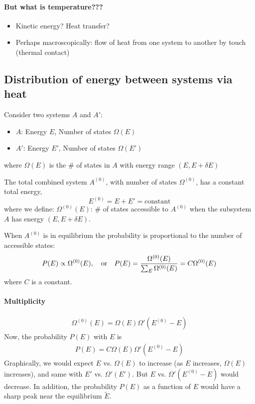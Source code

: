 \documentclass[../main.tex]{subfiles}
\begin{document}
\paragraph*{But what is temperature???}
\begin{itemize}
    \item Kinetic energy? Heat transfer?
    \item Perhaps macroscopically: flow of heat from one system to another by touch (thermal contact)
\end{itemize}

\subsection{Distribution of energy between systems via heat} Consider two systems $A$ and $A'$:
\begin{itemize}
    \item $A$: Energy $E$, Number of states $\Omega(E)$
    \item $A'$: Energy $E'$, Number of states $\Omega(E')$
\end{itemize}
where $\Omega(E)$ is the \# of states in $A$ with energy range $(E, E+\delta E)$

The total combined system $A^{(0)}$, with number of states $\Omega^{(0)}$, has a constant total energy,
\[E^{(0)} = E + E' = \textrm{constant}\]
where we define: $\Omega^{(0)}(E)$: \# of states accessible to $A^{(0)}$ when the subsystem $A$ has energy $(E, E+\delta E)$.

When $A^{(0)}$ is in equilibrium the probability is proportional to the number of accessible states:
\[P(E) \propto \Omega^{(0)} (E), \qor P(E) = \frac{\Omega^{(0)}(E)}{\sum_E \Omega^{(0)} (E)} = C \Omega^{(0)}(E)\]
where $C$ is a constant.

\paragraph*{Multiplicity}
\begin{align*}
    \Omega^{(0)}(E) = \Omega(E) \Omega'(E^{(0)} - E)
\end{align*}
Now, the probability $P(E)$ with $E$ is 
\begin{align*}
    P(E) = C \Omega(E) \Omega'(E^{(0)} - E)
\end{align*}
Graphically, we would expect $E$ vs. $\Omega(E)$ to increase (as $E$ increases, $\Omega(E)$ increases), and same with $E'$ vs. $\Omega'(E')$. But $E$ vs. $\Omega'(E^{(0)} - E)$ would decrease.
In addition, the probability $P(E)$ as a function of $E$ would have a sharp peak near the equilibrium $\tilde E$.
\end{document}
